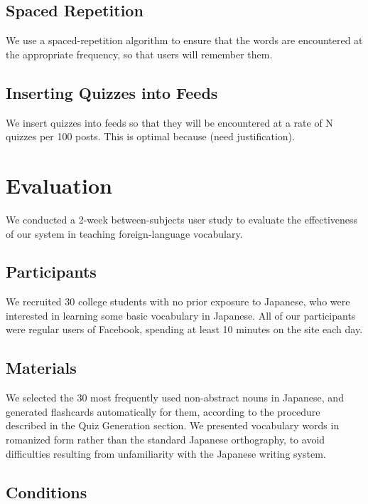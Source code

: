 \documentclass{chi-ext}
\begin{document}
\subsection{Spaced Repetition}

We use a spaced-repetition algorithm to ensure that the words are encountered at the appropriate frequency, so that users will remember them.

\subsection{Inserting Quizzes into Feeds}

We insert quizzes into feeds so that they will be encountered at a rate of N quizzes per 100 posts. This is optimal because (need justification).

\section{Evaluation}

We conducted a 2-week between-subjects user study to evaluate the effectiveness of our system in teaching foreign-language vocabulary.

\subsection{Participants}

We recruited 30 college students with no prior exposure to Japanese, who were interested in learning some basic vocabulary in Japanese. All of our participants were regular users of Facebook, spending at least 10 minutes on the site each day.

\subsection{Materials}

We selected the 30 most frequently used non-abstract nouns in Japanese, and generated flashcards automatically for them, according to the procedure described in the Quiz Generation section. We presented vocabulary words in romanized form rather than the standard Japanese orthography, to avoid difficulties resulting from unfamiliarity with the Japanese writing system.

\subsection{Conditions}
\end{document}
